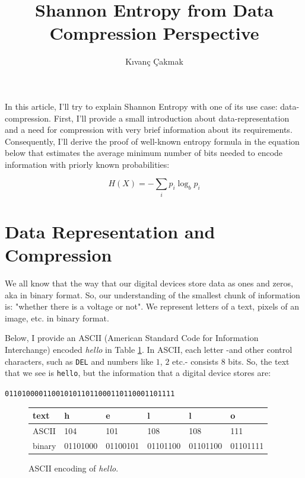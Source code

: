 \documentclass[11pt]{article}
\title{\textbf{Shannon Entropy from Data Compression Perspective}}
\author{K{\i}van\c{c} \c{C}akmak\\}
\date{}
\begin{document}
\maketitle

In this article, I'll try to explain Shannon Entropy with one of its use case: data-compression. First, I'll provide a small introduction about data-representation and a need for compression with very brief information about its requirements. Consequently, I'll derive the proof of well-known entropy formula in the equation below that estimates the average minimum number of bits needed to encode information with priorly known probabilities:

\begin{equation}
H(X) = -\sum_{i}p_{i}\log_{b}p_{i}
\label{Eq:entropy}
\end{equation}

\section{Data Representation and Compression}

We all know that the way that our digital devices store data as ones and zeros, aka in binary format. So, our understanding of the smallest chunk of information is: "whether there is a voltage or not". 
We represent letters of a text, pixels of an image, etc. in binary format. 

Below, I provide an ASCII (American Standard Code for Information Interchange) encoded \textit{hello} in Table \ref{table:hello}. In ASCII, each letter -and other control characters, such as \texttt{DEL} and numbers like $1$, $2$ etc.- consists $8$ bits. So, the text that we see is \texttt{hello}, but the information that a digital device stores are: 
\begin{center}
    \texttt{0110100001100101011011000110110001101111}
\end{center}

\begin{figure}
\begin{tabular}{| l | l | l | l | l | l |}
 \hline
  text   & h & e & l & l & o\\ \hline
  ASCII  & 104 & 101 & 108 & 108 & 111 \\ \hline 
  binary & 01101000 & 01100101 & 01101100 & 01101100 & 01101111 \\ 
  \hline
\end{tabular}
\caption{ASCII encoding of \textit{hello}.}
\label{table:hello}
\end{figure}
\end{document}

